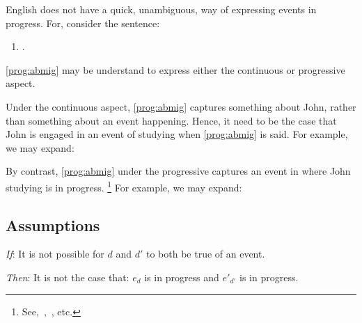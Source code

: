 \begin{note}
  \noindent%
  English does not have a quick, unambiguous, way of expressing events in progress.
  For, consider the sentence:
  \begin{enumerate}[label=\arabic*., ref=(\arabic*)]
  \item
    \label{prog:abmig}
    .
  \end{enumerate}
  \ref{prog:abmig} may be understand to express either the continuous or progressive aspect.

  Under the continuous aspect, \ref{prog:abmig} captures something about John, rather than something about an event happening.
  Hence, it need to be the case that John is engaged in an event of studying when \ref{prog:abmig} is said.
  For example, we may expand:

  By contrast, \ref{prog:abmig} under the progressive captures an event in where John studying is in progress.%
  \footnote{
    See,~\textcite{Richards:1981wo},~\textcite{Portner:2011vi}, etc.
  }
  For example, we may expand:
\end{note}


\subsection{Assumptions}
\label{sec:assumptions-1}


\begin{note}
  \begin{assumption}[Exclusivity]
    \label{assu:p:ex}
    \vspace{-\baselineskip}
    \begin{itenum}
    \item[\emph{If}:]
      It is not possible for \(d\) and \(d'\) to both be true of an event.
    \item[\emph{Then}:]
      It is not the case that: \(e_{d}\) is in progress and \(e'_{d'}\) is in progress.
    \end{itenum}
    \vspace{-\baselineskip}
  \end{assumption}
\end{note}



